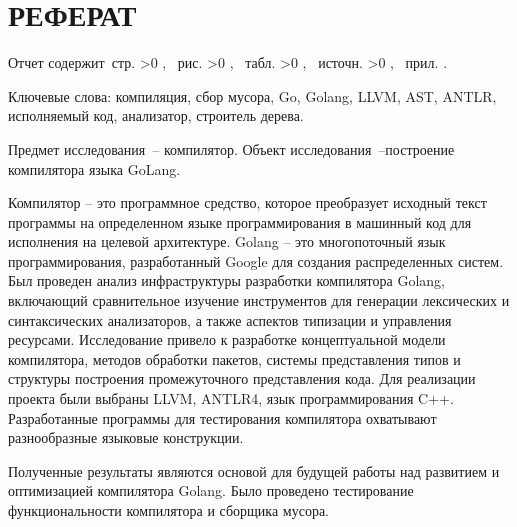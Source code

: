 \chapter{РЕФЕРАТ}%

Отчет содержит \pageref{LastPage}\,стр.%
\ifnum \totfig >0
, \totfig~рис.%
\fi
\ifnum \tottab >0
, \tottab~табл.%
\fi
%
\ifnum \totbib >0
, \totbib~источн.%
\fi
%
\ifnum \totapp >0
, \totapp~прил.%
\else
.%
\fi


Ключевые слова: компиляция, сбор мусора, Go, Golang, LLVM, AST, ANTLR, исполняемый код, анализатор, строитель дерева.

Предмет исследования~-- компилятор.
Объект исследования~--построение компилятора языка GoLang.


Компилятор – это программное средство, которое преобразует исходный текст программы на определенном языке программирования в машинный код для исполнения на целевой архитектуре.
Golang – это многопоточный язык программирования, разработанный Google для создания распределенных систем.
Был проведен анализ инфраструктуры разработки компилятора Golang, включающий сравнительное изучение инструментов для генерации лексических и синтаксических анализаторов, а также аспектов типизации и управления ресурсами.
Исследование привело к разработке концептуальной модели компилятора, методов обработки пакетов, системы представления типов и структуры построения промежуточного представления кода.
Для реализации проекта были выбраны LLVM, ANTLR4, язык программирования C++.
Разработанные программы для тестирования компилятора охватывают разнообразные языковые конструкции.

Полученные результаты являются основой для будущей работы над развитием и оптимизацией компилятора Golang.
Было проведено тестирование функциональности компилятора и сборщика мусора.




